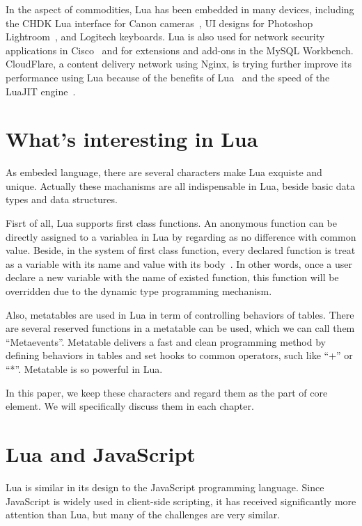 In the aspect of commodities, Lua has been embedded in many devices, including the CHDK Lua interface for Canon cameras~\cite{CLFL}, UI designs for Photoshop Lightroom~\cite{APLL}, and Logitech keyboards. Lua is also used for network security applications in Cisco~\cite{CISCO} and for extensions and add-ons in the MySQL Workbench. CloudFlare, a content delivery network using Nginx, is trying further improve its performance using Lua because of the benefits of Lua~\cite{NPL} and the speed of the LuaJIT engine~\cite{LJT}.

\section{What's interesting in Lua}
As embeded language, there are several characters make Lua exquiste and unique. 
Actually these machanisms are all indispensable in Lua, beside basic data types and data structures.

Fisrt of all, Lua supports first class functions. 
An anonymous function can be directly assigned to a variablea in Lua by regarding as no difference with common value.
Beside, in the system of first class function, every declared function is treat as a variable with its name and value with its body~\cite{FCV}.
In other words, once a user declare a new variable with the name of existed function, this function will be overridden due to the dynamic type programming mechanism.

Also, metatables are used in Lua in term of controlling behaviors of tables.
There are several reserved functions in a metatable can be used, which we can call them ``Metaevents''.
Metatable delivers a fast and clean programming method by defining behaviors in tables and set hooks to common operators, such like ``+'' or ``*''.
Metatable is so powerful in Lua.

In this paper, we keep these characters and regard them as the part of core element.
We will specifically discuss them in each chapter.

\section{Lua and JavaScript}
Lua is similar in its design to the JavaScript programming language.
Since JavaScript is widely used in client-side scripting,
it has received significantly more attention than Lua,
but many of the challenges are very similar.

